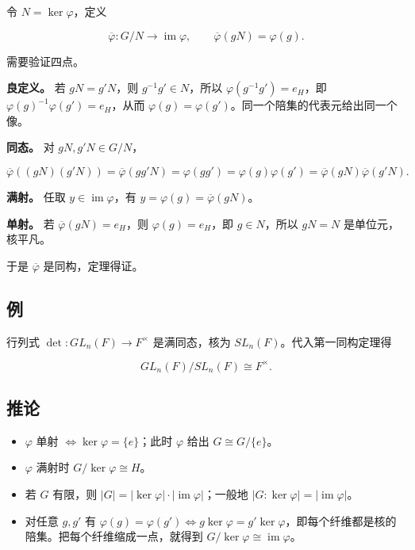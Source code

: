 令 $N=\ker\varphi$，定义

\[\overline\varphi:G/N\longrightarrow\operatorname{im}\varphi,\qquad \overline\varphi(gN)=\varphi(g).\]

需要验证四点。

\textbf{良定义。} 若 $gN=g'N$，则 $g^{-1}g'\in N$，所以 $\varphi(g^{-1}g')=e_H$，即 $\varphi(g)^{-1}\varphi(g')=e_H$，从而 $\varphi(g)=\varphi(g')$。同一个陪集的代表元给出同一个像。

\textbf{同态。} 对 $gN,g'N\in G/N$，

\[\overline\varphi((gN)(g'N))=\overline\varphi(gg'N)=\varphi(gg')=\varphi(g)\varphi(g')=\overline\varphi(gN)\overline\varphi(g'N).\]

\textbf{满射。} 任取 $y\in\operatorname{im}\varphi$，有 $y=\varphi(g)=\overline\varphi(gN)$。

\textbf{单射。} 若 $\overline\varphi(gN)=e_H$，则 $\varphi(g)=e_H$，即 $g\in N$，所以 $gN=N$ 是单位元，核平凡。

于是 $\overline\varphi$ 是同构，定理得证。

\subsection{例}


行列式 $\det:GL_n(F)\to F^\times$ 是满同态，核为 $SL_n(F)$。代入第一同构定理得

\[GL_n(F)/SL_n(F)\cong F^\times.\]

\subsection{推论}


\begin{itemize}
\item $\varphi$ 单射 $\iff\ker\varphi=\{e\}$；此时 $\varphi$ 给出 $G\cong G/\{e\}$。
\item $\varphi$ 满射时 $G/\ker\varphi\cong H$。
\item 若 $G$ 有限，则 $|G|=|\ker\varphi|\cdot|\operatorname{im}\varphi|$；一般地 $|G:\ker\varphi|=|\operatorname{im}\varphi|$。
\item 对任意 $g,g'$ 有 $\varphi(g)=\varphi(g')\iff g\ker\varphi=g'\ker\varphi$，即每个纤维都是核的陪集。把每个纤维缩成一点，就得到 $G/\ker\varphi\cong\operatorname{im}\varphi$。
\end{itemize}
